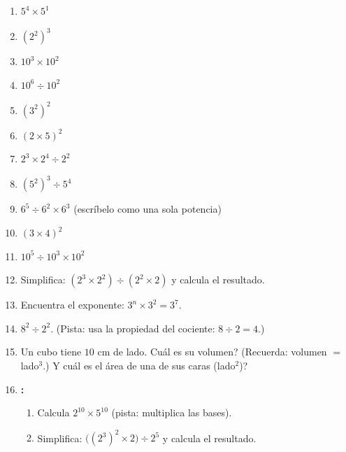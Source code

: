 \documentclass[12pt, letterpaper]{article}
\begin{document}
\begin{enumerate}[leftmargin=*, start=42]
  \item \facil{} $5^4 \times 5^1$

  \item \facil{} $(2^2)^3$

  \item \medio{} $10^3 \times 10^2$

  \item \medio{} $10^6 \div 10^2$

  \item \medio{} $(3^2)^2$

  \item \medio{} $(2 \times 5)^2$

  \item \medio{} $2^3 \times 2^4 \div 2^2$

  \item \medio{} $(5^2)^3 \div 5^4$

  \item \medio{} $6^5 \div 6^2 \times 6^3$ (escríbelo como una sola potencia)

  \item \medio{} $(3 \times 4)^2$

  \item \medio{} $10^5 \div 10^3 \times 10^2$

  \item \dificil{} Simplifica: $(2^3 \times 2^2) \div (2^2 \times 2)$ y calcula el resultado.

  \item \dificil{} Encuentra el exponente: $3^n \times 3^2 = 3^7$.

  \item \dificil{} $8^2 \div 2^2$. (Pista: usa la propiedad del cociente: $8 \div 2 = 4$.)

  \item \dificil{} Un cubo tiene $10$ cm de lado. \textquestiondown Cuál es su volumen? (Recuerda: volumen $=$ lado$^3$.) \textquestiondown Y cuál es el área de una de sus caras (lado$^2$)?

  \item \dificil{} \textbf{:}
        \begin{enumerate}[label=\alph*)]
          \item Calcula $2^{10} \times 5^{10}$ (pista: multiplica las bases).
          \item Simplifica: $\big((2^3)^2 \times 2\big) \div 2^5$ y calcula el resultado.
        \end{enumerate}
\end{enumerate}
\end{document}
